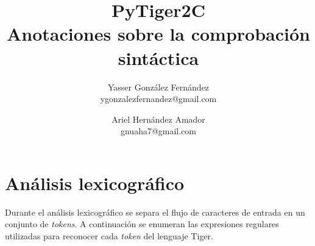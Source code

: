 \documentclass{article}
\title{
	\LARGE{PyTiger2C} \\
	\Large{Anotaciones sobre la comprobación sintáctica}
}
\author{
  	Yasser González Fernández \\
  	\small{ygonzalezfernandez@gmail.com}
  	\and
  	Ariel Hernández Amador \\
  	\small{gnuaha7@gmail.com}
}
\date{}
\begin{document}
\maketitle

\thispagestyle{empty}

\newpage

\setcounter{page}{1}

\section{Análisis lexicográfico}

Durante el análisis lexicográfico se separa el flujo de caracteres de entrada
en un conjunto de \emph{tokens}. A continuación se enumeran las expresiones
regulares utilizadas para reconocer cada \emph{token} del lenguaje Tiger.
\end{document}
